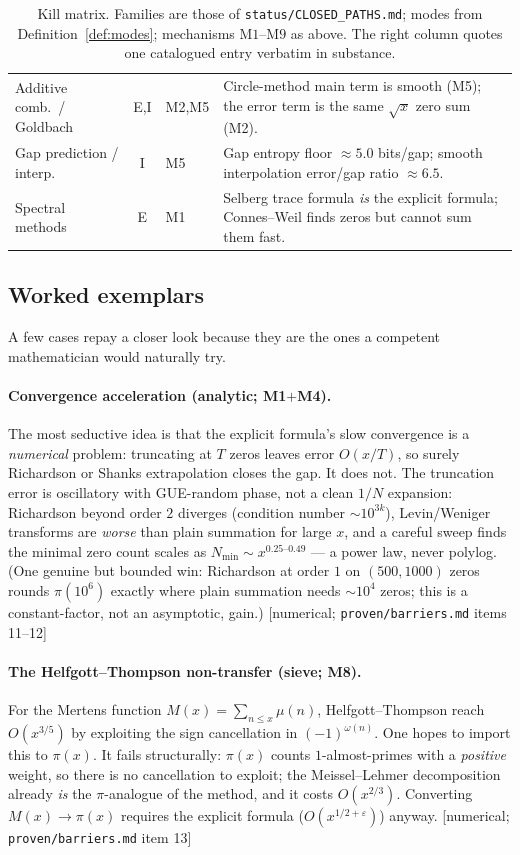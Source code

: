 \documentclass[11pt]{article}
\theoremstyle{plain}
\theoremstyle{definition}
\theoremstyle{remark}
\newcommand{\stat}[1]{\quad\textnormal{\footnotesize\textsf{[\textcolor{accent}{#1}]}}}
\newcommand{\eps}{\varepsilon}
\begin{document}
\begin{table}[t]
\begin{tabular}{@{}p{2.55cm} c p{2.05cm} p{7.4cm}@{}}
Additive comb.\ / Goldbach & E,I & M2,M5 & Circle-method main term is smooth (M5); the error term is the same $\sqrt{x}$ zero sum (M2). \\
Gap prediction / interp. & I & M5 & Gap entropy floor ${\approx}5.0$ bits/gap; smooth interpolation error/gap ratio ${\approx}6.5$. \\
Spectral methods & E & M1 & Selberg trace formula \emph{is} the explicit formula; Connes--Weil finds zeros but cannot sum them fast. \\
\bottomrule
\end{tabular}
\caption{Kill matrix. Families are those of \texttt{status/CLOSED\_PATHS.md};
modes from Definition~\ref{def:modes}; mechanisms $\mathrm{M1}$--$\mathrm{M9}$ as
above. The right column quotes one catalogued entry verbatim in substance.}
\label{tab:kill}
\end{table}

\subsection{Worked exemplars}

A few cases repay a closer look because they are the ones a competent
mathematician would naturally try.

\paragraph{Convergence acceleration (analytic; M1$+$M4).}
The most seductive idea is that the explicit formula's slow convergence is a
\emph{numerical} problem: truncating at $T$ zeros leaves error $O(x/T)$, so surely
Richardson or Shanks extrapolation closes the gap. It does not. The truncation
error is oscillatory with GUE-random phase, not a clean $1/N$ expansion: Richardson
beyond order $2$ diverges (condition number ${\sim}10^{3k}$), Levin/Weniger
transforms are \emph{worse} than plain summation for large $x$, and a careful
sweep finds the minimal zero count scales as $N_{\min}\sim x^{0.25\text{--}0.49}$
--- a power law, never polylog. (One genuine but bounded win: Richardson at order
$1$ on $(500,1000)$ zeros rounds $\pi(10^6)$ exactly where plain summation needs
${\sim}10^4$ zeros; this is a constant-factor, not an asymptotic, gain.)
\stat{numerical; \texttt{proven/barriers.md} items 11--12}

\paragraph{The Helfgott--Thompson non-transfer (sieve; M8).}
For the Mertens function $M(x)=\sum_{n\le x}\mu(n)$, Helfgott--Thompson reach
$O(x^{3/5})$ by exploiting the sign cancellation in $(-1)^{\omega(n)}$. One hopes
to import this to $\pi(x)$. It fails structurally: $\pi(x)$ counts $1$-almost-primes
with a \emph{positive} weight, so there is no cancellation to exploit; the
Meissel--Lehmer decomposition already \emph{is} the $\pi$-analogue of the method,
and it costs $O(x^{2/3})$. Converting $M(x)\to\pi(x)$ requires the explicit formula
($O(x^{1/2+\eps})$) anyway.
\stat{numerical; \texttt{proven/barriers.md} item 13}
\end{document}
